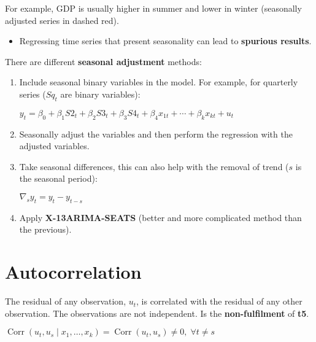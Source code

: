 \documentclass[10pt, a4paper, landscape]{article}
\DeclareMathOperator{\Corr}{Corr}
\begin{document}
\begin{multicols}{3}
\begin{multicols}{2}
\end{multicols}

For example, GDP is usually higher in summer and lower in winter (seasonally adjusted series in {\color{red} dashed red}).

\begin{itemize}[leftmargin=*]
	\item Regressing time series that present seasonality can lead to \textbf{spurious results}.
\end{itemize}

There are different \textbf{seasonal adjustment} methods:

\begin{enumerate}[leftmargin=*, label=\alph{*}.]
	\item Include seasonal binary variables in the model. For example, for quarterly series (\( S q_{t} \) are binary variables):
	\begin{center}
		\( y_{t} = \beta_{0} + \beta_{1} S2_{t} + \beta_{2} S3_{t} + \beta_{3} S4_{t} + \beta_{4} x_{1t} + \cdots + \beta_{k} x_{kt} + u_{t} \)
	\end{center}
	\item Seasonally adjust the variables and then perform the regression with the adjusted variables.
	\item Take seasonal differences, this can also help with the removal of trend (\( s \) is the seasonal period):
	\begin{center}
		\( \nabla_{s} y_{t} = y_{t} - y_{t - s} \)
	\end{center}
	\item Apply \textbf{X-13ARIMA-SEATS} (better and more complicated method than the previous).
\end{enumerate}

\columnbreak

\section*{Autocorrelation}

The residual of any observation, \( u_{t} \), is correlated with the residual of any other observation. The observations are not independent. Is the \textbf{non-fulfilment} of \textbf{t5}.

\begin{center}
	\( \Corr(u_{t}, u_{s} \mid x_{1}, \ldots, x_{k}) = \Corr(u_{t}, u_{s}) \neq 0, \; \forall t \neq s \)
\end{center}


\end{multicols}
\end{document}
